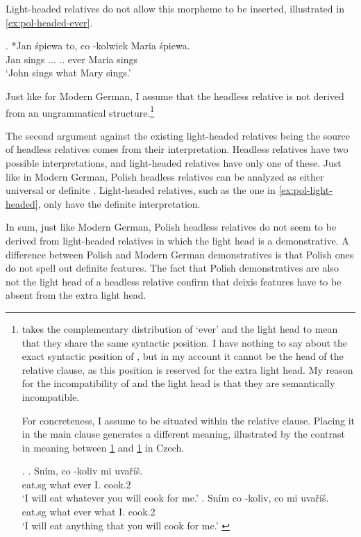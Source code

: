 Light-headed relatives do not allow this morpheme to be inserted, illustrated in \ref{ex:pol-headed-ever}.

\exg. *Jan śpiewa to, co -kolwiek Maria śpiewa.\\
Jan sings ... .. ever Maria sings\\
`John sings what Mary sings.' \label{ex:pol-headed-ever}

Just like for Modern German, I assume that the headless relative is not derived from an ungrammatical structure.\footnote{
\citet{citko2004} takes the complementary distribution of  `ever' and the light head to mean that they share the same syntactic position. I have nothing to say about the exact syntactic position of , but in my account it cannot be the head of the relative clause, as this position is reserved for the extra light head. My reason for the incompatibility of  and the light head is that they are semantically incompatible.

For concreteness, I assume  to be situated within the relative clause. Placing it in the main clause generates a different meaning, illustrated by the contrast in meaning between \ref{ex:cz-wh-ever} and \ref{ex:cz-ever-wh} in Czech.

\ex.
\ag. Sním, co -koliv mi uvaříš.\\
 eat.sg what ever I. cook.2\\
 `I will eat whatever you will cook for me.'\label{ex:cz-wh-ever}
\bg. Sním co -koliv, co mi uvaříš.\\
 eat.sg what ever what I. cook.2\\
 `I will eat anything that you will cook for me.' \label{ex:cz-ever-wh}

\phantom{x}
}

The second argument against the existing light-headed relatives being the source of headless relatives comes from their interpretation. Headless relatives have two possible interpretations, and light-headed relatives have only one of these.
Just like in Modern German, Polish headless relatives can be analyzed as either universal or definite .
Light-headed relatives, such as the one in \ref{ex:pol-light-headed}, only have the definite interpretation.

In sum, just like Modern German, Polish headless relatives do not seem to be derived from light-headed relatives in which the light head is a demonstrative. A difference between Polish and Modern German demonstratives is that Polish ones do not spell out definite features. The fact that Polish demonstratives are also not the light head of a headless relative confirm that deixis features have to be absent from the extra light head.


